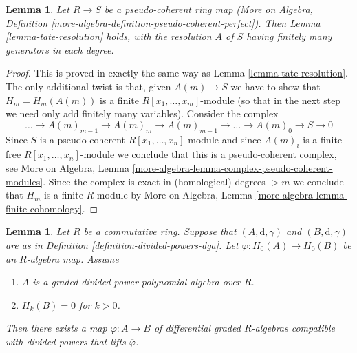 \documentclass{stacks-project}
\theoremstyle{plain}
\newtheorem{lemma}[subsection]{Lemma}
\theoremstyle{definition}
\theoremstyle{remark}
\numberwithin{equation}{subsection}
\begin{document}
\begin{lemma}
\label{lemma-tate-resoluton-pseudo-coherent-ring-map}
Let $R \to S$ be a pseudo-coherent ring map (More on Algebra, Definition
\ref{more-algebra-definition-pseudo-coherent-perfect}). Then
Lemma \ref{lemma-tate-resolution} holds, with the resolution $A$ of $S$
having finitely many generators in each degree.
\end{lemma}

\begin{proof}
This is proved in exactly the same way as Lemma \ref{lemma-tate-resolution}.
The only additional twist is that, given $A(m) \to S$ we have to
show that $H_m = H_m(A(m))$ is a finite $R[x_1, \ldots, x_m]$-module
(so that in the next step we need only add finitely many variables).
Consider the complex
$$
\ldots \to A(m)_{m - 1} \to A(m)_m \to A(m)_{m - 1} \to
\ldots \to A(m)_0 \to S \to 0
$$
Since $S$ is a pseudo-coherent $R[x_1, \ldots, x_n]$-module
and since $A(m)_i$ is a finite free $R[x_1, \ldots, x_n]$-module
we conclude that this is a pseudo-coherent complex, see
More on Algebra, Lemma \ref{more-algebra-lemma-complex-pseudo-coherent-modules}.
Since the complex is exact in (homological) degrees $> m$
we conclude that $H_m$ is a finite $R$-module by
More on Algebra, Lemma \ref{more-algebra-lemma-finite-cohomology}.
\end{proof}

\begin{lemma}
\label{lemma-uniqueness-tate-resolution}
Let $R$ be a commutative ring. Suppose that $(A, \text{d}, \gamma)$ and
$(B, \text{d}, \gamma)$ are as in
Definition \ref{definition-divided-powers-dga}.
Let $\overline{\varphi} : H_0(A) \to H_0(B)$ be an $R$-algebra map.
Assume
\begin{enumerate}
\item $A$ is a graded divided power polynomial algebra over $R$.
\item $H_k(B) = 0$ for $k > 0$.
\end{enumerate}
Then there exists a map $\varphi : A \to B$ of differential
graded $R$-algebras compatible with divided powers
that lifts $\overline{\varphi}$.
\end{lemma}
\end{document}
